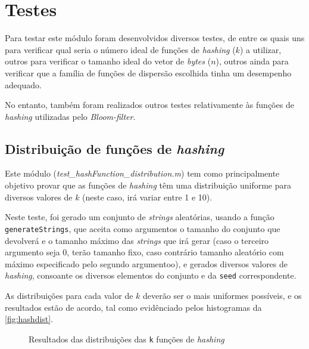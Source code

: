 \documentclass[a4paper,11pt,openright,oneside]{report}
\begin{document}
\section{Testes}
\label{sec.bloomtests}

Para testar este módulo foram desenvolvidos diversos testes, de entre os quais uns para verificar qual seria o número ideal de funções de \textit{hashing} ($k$) a utilizar, outros para verificar o tamanho ideal do vetor de \textit{bytes} ($n$), outros ainda para verificar que a família de funções de dispersão escolhida tinha um desempenho adequado.

No entanto, também foram realizados outros testes relativamente às funções de \textit{hashing} utilizadas pelo \textit{Bloom-filter}.

\subsection{Distribuição de funções de \textit{hashing}}
\label{subsec.hashdist}

Este módulo (\textit{test\_hashFunction\_distribution.m}) tem como principalmente objetivo provar que as funções de \textit{hashing} têm uma distribuição uniforme para diversos valores de $k$ (neste caso, irá variar entre 1 e 10).

Neste teste, foi gerado um conjunto de \textit{strings} aleatórias, usando a função \texttt{generateStrings}, que aceita como argumentos o tamanho do conjunto que devolverá e o tamanho máximo das \textit{strings} que irá gerar (caso o terceiro argumento seja $0$, terão tamanho fixo, caso contrário tamanho aleatório com máximo especificado pelo segundo argumentoo), e gerados diversos valores de \textit{hashing}, consoante os diversos elementos do conjunto e da \texttt{seed} correspondente.

As distribuições para cada valor de $k$ deverão ser o mais uniformes possíveis, e os resultados estão de acordo, tal como evidênciado pelos histogramas da \autoref{fig:hashdist}.

\begin{figure}[ht]	
\center
{}
\caption{Resultados das distribuições das \texttt{k} funções de \textit{hashing}}
\label{fig:hashdist}
\end{figure}
\end{document}

